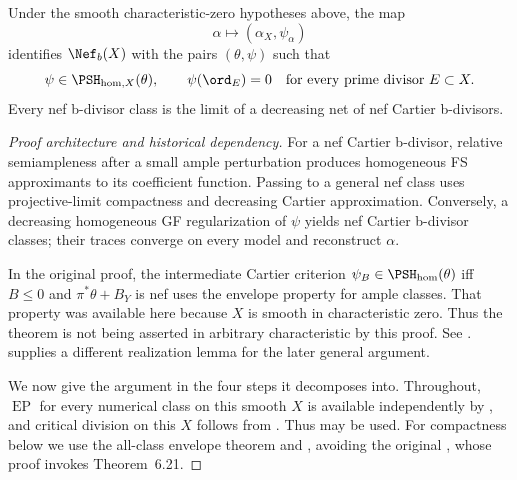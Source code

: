 \begin{theorem}\label{thm:bj-nef-bdivisor-correspondence}
Under the smooth characteristic-zero hypotheses above, the map
\begin{equation}
\label{eq:nef-bdivisor-psh-map}
 \alpha\longmapsto(\alpha_X,\psi_\alpha)
\end{equation}
identifies $\Nef_b(X)$ with the pairs $(\theta,\psi)$ such that
\begin{equation}
\label{eq:nef-bdivisor-psh-pairs}
 \psi\in\PSH_{\mathrm{hom},X}(\theta),\qquad
 \psi(\ord_E)=0
 \quad\text{for every prime divisor }E\subset X.
\end{equation}
Every nef b-divisor class is the limit of a decreasing net of nef Cartier
b-divisors.
\end{theorem}

\begin{proof}[Proof architecture and historical dependency]
For a nef Cartier b-divisor, relative semiampleness after a small ample
perturbation produces homogeneous FS approximants to its coefficient
function.  Passing to a general nef class uses projective-limit compactness
and decreasing Cartier approximation.  Conversely, a decreasing homogeneous
GF regularization of $\psi$ yields nef Cartier b-divisor classes; their
traces converge on every model and reconstruct $\alpha$.

In the original proof, the intermediate Cartier criterion
$\psi_B\in\PSH_{\mathrm{hom}}(\theta)$ iff
$B\leq0$ and $\pi^*\theta+B_Y$ is nef uses the envelope property for
ample classes.  That property was available here because $X$ is smooth in
characteristic zero.  Thus the theorem is not being asserted in arbitrary
characteristic by this proof.  See \cite[Theorems~6.35 and~6.40,
Corollary~6.41]{BJ22}.   supplies a
different realization lemma
for the later general argument.

We now give the argument in the four steps it decomposes into. Throughout,
$\operatorname{EP}$ for every numerical class on this smooth $X$ is
available independently by \cite[Theorem~A]{BJ22b}, and critical division
on this $X$ follows from \cite[Proposition~17]{BJGreen24}. Thus
 may be used. For compactness below
we use the all-class envelope theorem and
\cite[Theorem~5.11\,(ii)]{BJ22}, avoiding the original
\cite[Corollary~6.22]{BJ22}, whose proof invokes Theorem~6.21.


\end{proof}
